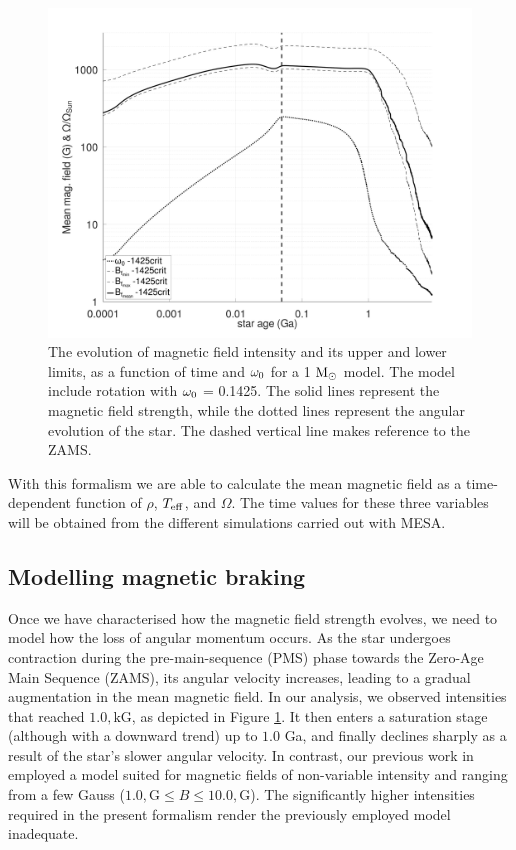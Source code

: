 \documentclass[fleqn,usenatbib]{mnras}
\begin{document}
\begin{figure}
	\includegraphics[clip,width=\columnwidth]{figures/paper2/mag_field_limits_var_vel_g3.pdf}
    \caption{The evolution of magnetic field intensity and its upper and lower limits, as a function of time and $\omega_{\mathrm{0}}$ for a 1 $\mathrm{M}_\odot$ model. The model include rotation with $\omega_{\mathrm{0}}$ = 0.1425. The solid lines represent the magnetic field strength, while the dotted lines represent the angular evolution of the star. The dashed vertical line makes reference to the ZAMS.}
    \label{fig:mag_field_limits_var_vel_g3}
\end{figure}

With this formalism we are able to calculate the mean magnetic field as a time-dependent function of $\rho$, $T_{\mathrm{eff}}$, and $\Omega$. The time values for these three variables will be obtained from the different simulations carried out with MESA.

\subsection{Modelling magnetic braking} \label{mod_mb}
Once we have characterised how the magnetic field strength evolves, we need to model how the loss of angular momentum occurs. As the star undergoes contraction during the pre-main-sequence (PMS) phase towards the Zero-Age Main Sequence (ZAMS), its angular velocity increases, leading to a gradual augmentation in the mean magnetic field. In our analysis, we observed intensities that reached $1.0,\mathrm{kG}$, as depicted in Figure \ref{fig:mag_field_limits_var_vel_g3}. It then enters a saturation stage (although with a downward trend) up to $1.0$ Ga, and finally declines sharply as a result of the star's slower angular velocity. In contrast, our previous work in \citet{Caballero2020} employed a model suited for magnetic fields of non-variable intensity and ranging from a few Gauss ($1.0,\mathrm{G} \leq B \leq 10.0,\mathrm{G}$). The significantly higher intensities required in the present formalism render the previously employed model inadequate.\par
\end{document}
